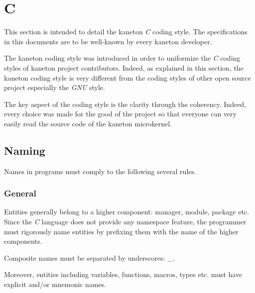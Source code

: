 %
%
%
%
%
%

%
%

\section{C}

This section is intended to detail the kaneton \textit{C} coding style.
The specifications in this documents are to be well-known by every kaneton
developer.

The kaneton coding style was introduced in order to uniformize the \textit{C}
coding styles of kaneton project contributors. Indeed, as explained in this
section, the kaneton coding style is very different from the coding styles
of other open source project especially the \textit{GNU} style.

The key aspect of the coding style is the clarity through the coherency.
Indeed, every choice was made for the good of the project so that everyone
can very easily read the source code of the kaneton microkernel.

%
%

\subsection{Naming}

Names in programs must comply to the following several rules.


\subsubsection{General}

Entities generally belong to a higher component: manager, module, package etc.
Since the \textit{C} language does not provide any namespace feature, the
programmer must rigorously name entities by prefixing them with the name
of the higher components.

Composite names must be separated by underscores: \textit{\_}.

Moreover, entities including variables, functions, macros, types etc. must
have explicit and/or mnemonic names.

